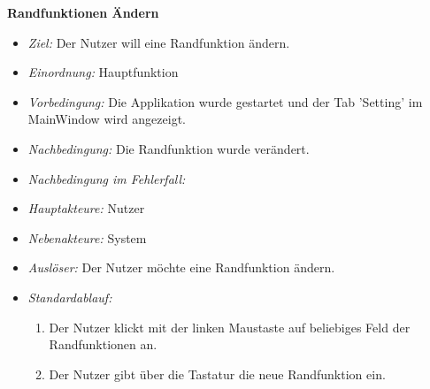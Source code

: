 \textbf{Randfunktionen \"Andern}
  \begin{itemize}
  \item \textit{Ziel:} Der Nutzer will eine Randfunktion \"andern.
  \item \textit{Einordnung:} Hauptfunktion
  \item \textit{Vorbedingung:} Die Applikation wurde gestartet und der Tab 'Setting' im MainWindow wird angezeigt.
  \item \textit{Nachbedingung:} Die Randfunktion wurde ver\"andert.
  \item \textit{Nachbedingung im Fehlerfall:}  
  \item \textit{Hauptakteure:} Nutzer
  \item \textit{Nebenakteure:} System
  \item \textit{Ausl\"oser:} Der Nutzer m\"ochte eine Randfunktion \"andern.
  \item \textit{Standardablauf:}
    \begin{enumerate}
    \item Der Nutzer klickt mit der linken Maustaste auf beliebiges Feld der Randfunktionen an.
    \item Der Nutzer gibt \"uber die Tastatur die neue Randfunktion ein. 
  \end{enumerate}
  \end{itemize}